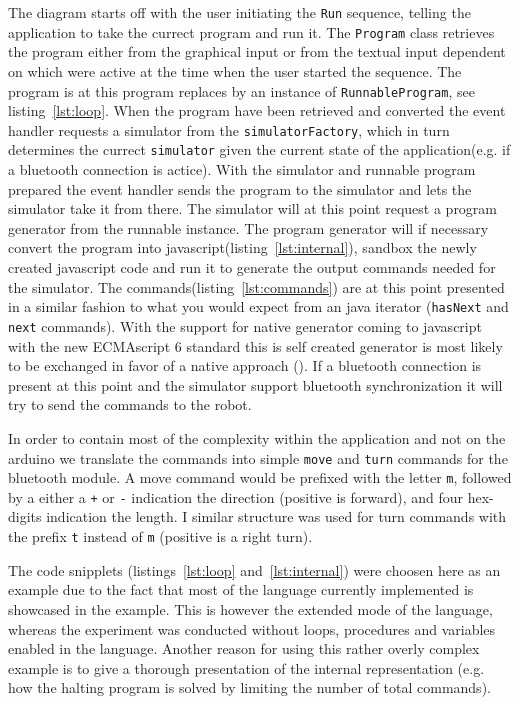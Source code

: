 \bigskip\noindent
The diagram starts off with the user initiating the \texttt{Run} sequence, telling the application to take the currect program and run it. 
The \texttt{Program} class retrieves the program either from the graphical input or from the textual input dependent on which were active at the time when the user started the sequence. The program is at this program replaces by an instance of \texttt{RunnableProgram}, see listing~\ref{lst:loop}.
When the program have been retrieved and converted the event handler requests a simulator from the \texttt{simulatorFactory}, which in turn determines the currect \texttt{simulator} given the current state of the application(e.g. if a bluetooth connection is actice). 
With the simulator and runnable program prepared the event handler sends the program to the simulator and lets the simulator take it from there.
The simulator will at this point request a program generator from the runnable instance.
The program generator will if necessary convert the program into javascript(listing~\ref{lst:internal}), sandbox the newly created javascript code and run it to generate the output commands needed for the simulator. The commands(listing~\ref{lst:commands}) are at this point presented in a similar fashion to what you would expect from an java iterator (\texttt{hasNext} and \texttt{next} commands). With the support for native generator coming to javascript with the new ECMAscript 6 standard this is self created generator is most likely to be exchanged in favor of a native approach (\cite{mozillaES6}).
If a bluetooth connection is present at this point and the simulator support bluetooth synchronization it will try to send the commands to the robot. 

\bigskip\noindent
In order to contain most of the complexity within the application and not on the arduino we translate the commands into simple \texttt{move} and \texttt{turn} commands for the bluetooth module. A move command would be prefixed with the letter \texttt{m}, followed by a either a \texttt{+} or \texttt{-} indication the direction (positive is forward), and four hex-digits indication the length. I similar structure was used for turn commands with the prefix \texttt{t} instead of \texttt{m} (positive is a right turn).


\bigskip\noindent
The code snipplets (listings~\ref{lst:loop} and~\ref{lst:internal}) were choosen here as an example due to the fact that most of the language currently implemented is showcased in the example. This is however the extended mode of the language, whereas the experiment was conducted without loops, procedures and variables enabled in the language. Another reason for using this rather overly complex example is to give a thorough presentation of the internal representation (e.g. how the halting program is solved by limiting the number of total commands).

